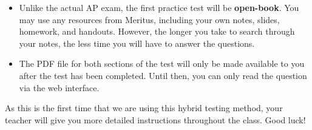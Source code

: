 \documentclass[letterpaper,11pt]{article}
\begin{document}
\begin{itemize}[itemsep=4pt,topsep=0pt,leftmargin=15pt]
\begin{itemize}
    \begin{center}
      \Large
      \href{https://ossfiles.ca/index.php/s/triZ3GP7SXwQpSi}
           {https://ossfiles.ca/index.php/s/triZ3GP7SXwQpSi}
    \end{center}
    The booklet will also be sent to you via the Zoom chat window during class
    as well.

  \item Your teacher will give you instructions on how to scan and upload your
    work for the FRQs after the class ends.
  \end{itemize}
  
\item Unlike the actual AP exam, the first practice test will be
  \textbf{open-book}. You
  may use any resources from Meritus, including your own notes, slides,
  homework, and handouts. However, the longer you take to search through your
  notes, the less time you will have to answer the questions.

\item The PDF file for both sections of the test will only be made available to
  you after the test has been completed. Until then, you can only read the
  question via the web interface.
\end{itemize}
  
As this is the first time that we are using this hybrid testing method, your
teacher will give you more detailed instructions throughout the class. Good
luck!
\end{document}
